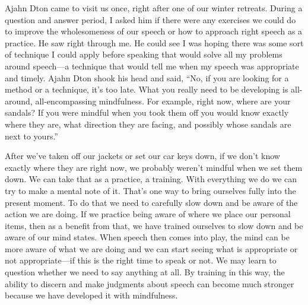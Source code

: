 
Ajahn Dton came to visit us once, right after one of our winter 
retreats. During a question and answer period, I asked him if there 
were any exercises we could do to improve the wholesomeness of our 
speech or how to approach right speech as a practice. He saw right 
through me. He could see I was hoping there was some sort of technique 
I could apply before speaking that would solve all my problems around 
speech---a technique that would tell me when my speech was appropriate 
and timely. Ajahn Dton shook his head and said, ``No, if you are 
looking for a method or a technique, it's too late. What you really 
need to be developing is all-around, all-encompassing mindfulness. For 
example, right now, where are your sandals? If you were mindful when 
you took them off you would know exactly where they are, what direction 
they are facing, and possibly whose sandals are next to yours.''

After we've taken off our jackets or set our car keys down, if we don't 
know exactly where they are right now, we probably weren't mindful when 
we set them down. We can take that as a practice, a training. With 
everything we do we can try to make a mental note of it. That's one way 
to bring ourselves fully into the present moment. To do that we need to 
carefully slow down and be aware of the action we are doing. If we 
practice being aware of where we place our personal items, then as a 
benefit from that, we have trained ourselves to slow down and be aware 
of our mind states. When speech then comes into play, the mind can be 
more aware of what we are doing and we can start seeing what is 
appropriate or not appropriate---if this is the right time to speak or 
not. We may learn to question whether we need to say anything at all. 
By training in this way, the ability to discern and make judgments 
about speech can become much stronger because we have developed it with 
mindfulness.

